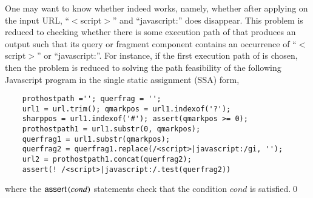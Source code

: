 \begin{example}
One may want to know whether {\urlxsssanitise} indeed works, namely, whether after applying {\urlxsssanitise} on the input URL, ``$<$script$>$'' and ``javascript:'' does disappear.  This problem is reduced to checking whether there is some execution path of {\urlxsssanitise} that produces an output such that its query or fragment component contains an occurrence of ``$<$script$>$'' or ``javascript:''. For instance, if the first execution path of {\urlxsssanitise} is chosen, then the problem is reduced to solving the path feasibility of the following Javascript program in the single static assignment (SSA) form,

{\small
\begin{verbatim}
    prothostpath =''; querfrag = '';
    url1 = url.trim(); qmarkpos = url1.indexof('?');
    sharppos = url1.indexof('#'); assert(qmarkpos >= 0); 
    prothostpath1 = url1.substr(0, qmarkpos);
    querfrag1 = url1.substr(qmarkpos);
    querfrag2 = querfrag1.replace(/<script>|javascript:/gi, '');
    url2 = prothostpath1.concat(querfrag2);
    assert(! /<script>|javascript:/.test(querfrag2))
\end{verbatim}
}
where the $\textsf{assert}\left(cond\right)$ statements check that the condition $cond$ is satisfied.\qed
\end{example}